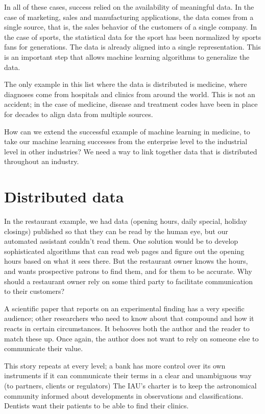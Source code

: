 In all of these cases, success relied on the availability of meaningful data.  In the case of marketing, sales and 
manufacturing applications, the data comes from a single source, that is, the sales behavior of the customers 
of a single company.  In the case of sports, the statistical data for the sport has been normalized
by sports fans for generations.  The data is already aligned into a single representation. This is an important
step that allows machine learning algorithms to generalize the data. 

The only example in this list where the data is distributed is medicine, where diagnoses come 
from hospitals and clinics from around the world.  This is not an accident; in the case of medicine, 
disease and treatment codes have been in place for decades to align data from multiple sources. 

How can we extend the successful example of machine learning in medicine, to take 
our machine learning successes from the enterprise level to the industrial level in other industries? 
We need a way to link together data that is distributed throughout an industry. 


\section{Distributed data}



In the restaurant example, we had data (opening hours, daily special, holiday closings) published so that they 
can be read by the human eye, but our automated assistant couldn't read them.  One solution 
would be to develop sophisticated algorithms that can read web pages and figure out
the opening hours based on what it sees there.  But the restaurant owner knows the hours, 
and wants prospective patrons to find them, and for them to be accurate.  Why should 
a restaurant owner rely on some third party to facilitate communication to their customers?  

A scientific paper that reports on an experimental finding has a very specific audience;
other researchers who need to know about that compound and how it reacts in certain circumstances. 
It behooves both the author and the reader to match these up.  Once again, the author does not
want to rely on someone else to communicate their value. 

This story repeats at every level; a bank has more control over its own instruments if it 
can communicate their terms in a clear and unambiguous way (to partners, clients or regulators)
The IAU's charter is to keep the astronomical community informed about developments in 
observations and classifications.  Dentists want their patients to be able to find their clinics. 

